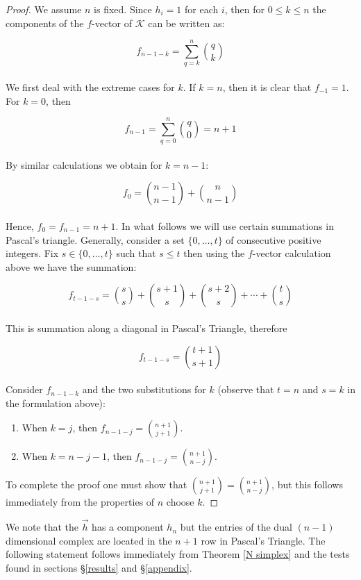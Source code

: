 \documentclass[oneside,12pt]{amsart}
\theoremstyle{definition}
\numberwithin{equation}{section}
\begin{document}
\begin{proof}
We assume $n$ is fixed.  Since $h_i = 1$ for each $i$, then for $0 \leq k \leq n$ the components of the
$f$-vector of $\mathcal{K}$ can be written as:

$$f_{n-1-k} = \sum_{q = k}^n \binom{q}{k}$$\\

We first deal with the extreme cases for $k$. If $k = n$, then it is clear that $f_{-1} = 1$.  For $k = 0$, then

$$f_{n-1} = \sum_{q = 0}^n \binom{q}{0} = n+1$$\\

By similar calculations we obtain for $k = n-1$:

$$f_0 = \binom{n-1}{n-1} + \binom{n}{n-1}$$\\

Hence, $f_0 = f_{n-1} = n+1$.  In what follows we will use certain summations in Pascal's triangle.  Generally, consider a set $\{0,\ldots,t\}$ of consecutive positive integers.  Fix $s \in \{0,\ldots,t\}$ such that $s \leq t $ then using the $f$-vector calculation above we have the summation:

$$f_{t-1-s} = \binom{s}{s} + \binom{s+1}{s} +\binom{s+2}{s} + \cdots + \binom{t}{s}$$\\

This is summation along a diagonal in Pascal's Triangle, therefore

$$f_{t-1-s} = \binom{t+1}{s+1}$$\\

Consider $f_{n-1-k}$ and the two substitutions for $k$ (observe that $t = n$ and $s = k$ in the formulation above):\\
\begin{enumerate}
  \item When $ k = j$, then $f_{n-1-j} =\displaystyle \binom{n+1}{j+1}$.\\
  \item When $ k= n-j-1$, then $f_{n-1-j} = \displaystyle\binom{n+1}{n-j}$.\\
\end{enumerate}

To complete the proof one must show that $\binom{n+1}{j+1} = \binom{n+1}{n-j}$, but this follows immediately from the properties of $n$ choose $k$.

\end{proof}

We note that the $\overrightarrow{h}$ has a component $h_n$ but the entries of the dual $(n-1)$ dimensional complex are located in the $n+1$ row in Pascal's Triangle.  The following statement follows immediately from Theorem \ref{N simplex} and the tests found in sections \S\ref{results} and \S\ref{appendix}. %
\end{document}
